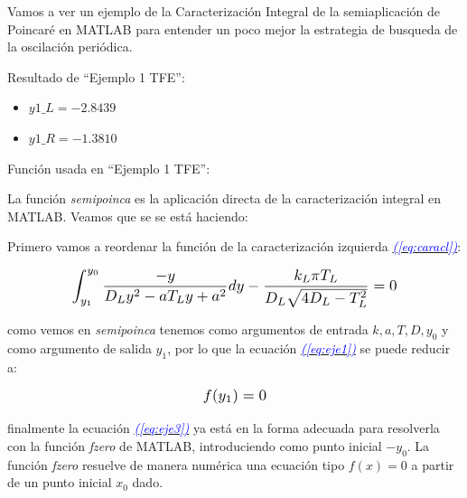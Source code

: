 \documentclass[12pt,a4paper]{report} %
\newcommand{\eref}[1]{\hyperref[#1]{\textcolor{blue}{\textit{(\ref*{#1})}}}}
\begin{document}
	\vspace{0.5cm} Vamos a ver un ejemplo de la Caracterización Integral de la semiaplicación de Poincaré en MATLAB para entender un poco mejor la estrategia de busqueda de la oscilación periódica.
	
	\vspace{1cm}
	
	\vspace{0.5cm}\noindent Resultado de ``Ejemplo 1 TFE'':
	\begin{itemize}
		\item $y1\_L=-2.8439$
		\item $y1\_R=-1.3810$
	\end{itemize}
	
	\vspace{1cm}\noindent Función usada en ``Ejemplo 1 TFE'':
	\vspace{0.5cm}
	
	\newpage
	
	La función \textit{semipoinca} es la aplicación directa de la caracterización integral en MATLAB. Veamos que se se está haciendo:
	
	\vspace{0.5cm}\noindent Primero vamos a reordenar la función de la caracterización izquierda \eref{eq:caracl}:
	
	\begin{equation}
			\label{eq:eje1}
		\scalebox{1.2}{$\displaystyle
		\begin{gathered}
			\int_{y_1}^{y_0}\frac{-y}{D_Ly^2-aT_Ly+a^2}dy-\frac{k_L\pi T_L}{D_L\sqrt{4D_L-T_L^2}}=0
		\end{gathered}
			$}
	\end{equation}\smallskip
	
	\noindent como vemos en \textit{semipoinca} tenemos como argumentos de entrada $k,a,T,D,y_0$ y como argumento de salida $y_1$, por lo que la ecuación \eref{eq:eje1} se puede reducir a:
	
		\begin{equation}
		\label{eq:eje3}
		\scalebox{1.2}{$\displaystyle
				f(y_1)=0
			$}
	\end{equation}\smallskip
	
	\noindent finalmente la ecuación \eref{eq:eje3} ya está en la forma adecuada para resolverla con la función \textit{fzero} de MATLAB, introduciendo como punto inicial $-y_0$. La función \textit{fzero} resuelve de manera numérica una ecuación tipo $f(x)=0$ a partir de un punto inicial $x_0$ dado.
	
\end{document}
